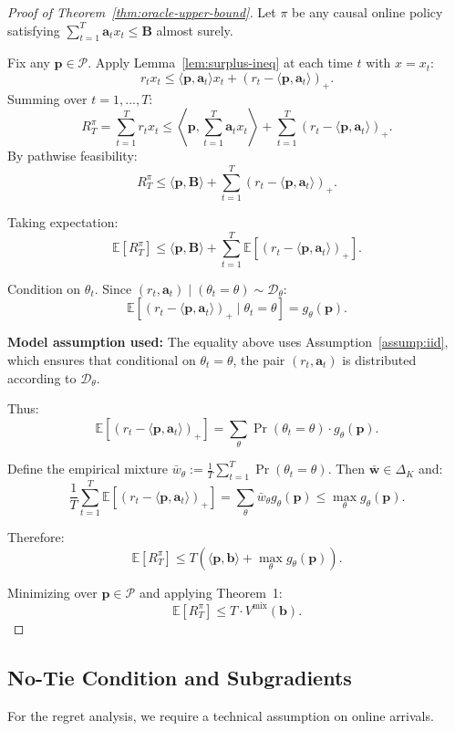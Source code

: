 \documentclass[11pt]{article}
\newcommand{\bB}{\mathbf{B}}
\newcommand{\bb}{\mathbf{b}}
\newcommand{\ba}{\mathbf{a}}
\newcommand{\bp}{\mathbf{p}}
\newcommand{\bw}{\mathbf{w}}
\newcommand{\E}{\mathbb{E}}
\newcommand{\cP}{\mathcal{P}}
\newcommand{\cD}{\mathcal{D}}
\begin{document}
\begin{proof}[Proof of Theorem~\ref{thm:oracle-upper-bound}]
Let $\pi$ be any causal online policy satisfying $\sum_{t=1}^T \ba_t x_t \le \bB$ almost surely.

Fix any $\bp \in \cP$. Apply Lemma~\ref{lem:surplus-ineq} at each time $t$ with $x = x_t$:
\[
r_t x_t \le \langle \bp, \ba_t \rangle x_t + (r_t - \langle \bp, \ba_t \rangle)_+.
\]
Summing over $t = 1, \ldots, T$:
\[
R_T^\pi = \sum_{t=1}^T r_t x_t \le \left\langle \bp, \sum_{t=1}^T \ba_t x_t \right\rangle + \sum_{t=1}^T (r_t - \langle \bp, \ba_t \rangle)_+.
\]
By pathwise feasibility:
\[
R_T^\pi \le \langle \bp, \bB \rangle + \sum_{t=1}^T (r_t - \langle \bp, \ba_t \rangle)_+.
\]

Taking expectation:
\[
\E[R_T^\pi] \le \langle \bp, \bB \rangle + \sum_{t=1}^T \E\left[(r_t - \langle \bp, \ba_t \rangle)_+\right].
\]

Condition on $\theta_t$. Since $(r_t, \ba_t) \mid (\theta_t = \theta) \sim \cD_\theta$:
\[
\E\left[(r_t - \langle \bp, \ba_t \rangle)_+ \mid \theta_t = \theta\right] = g_\theta(\bp).
\]

\textbf{Model assumption used:} The equality above uses Assumption~\ref{assump:iid}, which ensures that conditional on $\theta_t = \theta$, the pair $(r_t, \ba_t)$ is distributed according to $\cD_\theta$. 

Thus:
\[
\E\left[(r_t - \langle \bp, \ba_t \rangle)_+\right] = \sum_\theta \Pr(\theta_t = \theta) \cdot g_\theta(\bp).
\]

Define the empirical mixture $\bar{w}_\theta := \frac{1}{T} \sum_{t=1}^T \Pr(\theta_t = \theta)$. Then $\bar{\bw} \in \Delta_K$ and:
\[
\frac{1}{T} \sum_{t=1}^T \E\left[(r_t - \langle \bp, \ba_t \rangle)_+\right] = \sum_\theta \bar{w}_\theta g_\theta(\bp) \le \max_\theta g_\theta(\bp).
\]

Therefore:
\[
\E[R_T^\pi] \le T \left( \langle \bp, \bb \rangle + \max_\theta g_\theta(\bp) \right).
\]

Minimizing over $\bp \in \cP$ and applying Theorem~1:
\[
\E[R_T^\pi] \le T \cdot V^{\mathrm{mix}}(\bb).
\]
\end{proof}

\subsection{No-Tie Condition and Subgradients}

For the regret analysis, we require a technical assumption on online arrivals.
\end{document}
